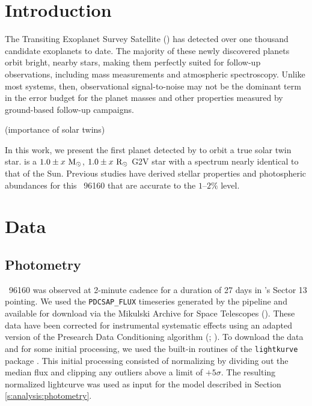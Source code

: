 \documentclass[modern]{aastex62}
\newcommand{\hoststar}{\acronym{HIP}\ 96160\xspace}
\newcommand{\stmass}{$1.0 \pm x\ \msun$\xspace}
\newcommand{\stradius}{$1.0 \pm x\ \rsun$\xspace}
\begin{document}
\section{Introduction}
\label{s:intro}

The Transiting Exoplanet Survey Satellite (\TESS) has detected over one thousand candidate exoplanets to date. 
The majority of these newly discovered planets orbit bright, nearby stars, making them perfectly suited for follow-up observations, including mass measurements and atmospheric spectroscopy. 
Unlike most \kepler systems, then, observational signal-to-noise may not be the dominant term in the error budget for the planet masses and other properties measured by ground-based follow-up campaigns.

(importance of solar twins)

In this work, we present the first planet detected by \TESS to orbit a true solar twin star. 
\object[HIP96160]{\hoststar} is a \stmass, \stradius G2V star with a spectrum nearly identical to that of the Sun. 
Previous studies have derived stellar properties and photospheric abundances for this \hoststar that are accurate to the $1\text{--}2\%$ level.



\section{Data}
\label{s:data}

\subsection{Photometry}

\hoststar was observed at 2-minute cadence for a duration of 27 days in \TESS's Sector 13 pointing. 
We used the \texttt{PDCSAP\_FLUX} timeseries generated by the \TESS pipeline and available for download via the Mikulski Archive for Space Telescopes (). 
These data have been corrected for instrumental systematic effects using an adapted version of the \kepler Presearch Data Conditioning algorithm (; ). 
To download the data and for some initial processing, we used the built-in routines of the \texttt{lightkurve} package . 
This initial processing consisted of normalizing by dividing out the median flux and clipping any outliers above a limit of $+5\sigma$. 
The resulting normalized lightcurve was used as input for the model described in Section \ref{s:analysis:photometry}.
\end{document}
